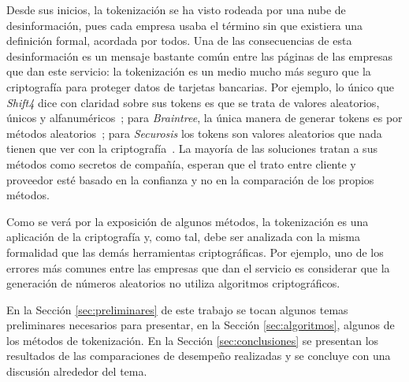 
Desde sus inicios, la tokenización se ha visto rodeada por una nube de
desinformación, pues cada empresa usaba el término sin que existiera una
definición formal, acordada por todos. Una de las consecuencias de esta
desinformación es un mensaje bastante común entre las páginas de las empresas
que dan este servicio: la tokenización es un medio mucho más seguro que la
criptografía para proteger datos de tarjetas bancarias. Por ejemplo, lo único
que \textit{Shift4} dice con claridad sobre sus tokens es que se trata de
valores aleatorios, únicos y alfanuméricos~\cite{shif4_uno}; para
\textit{Braintree}, la única manera de generar tokens es por métodos
aleatorios~\cite{braintree_uno}; para \textit{Securosis} los tokens son valores
aleatorios que nada tienen que ver con la criptografía~\cite{securosis}. La
mayoría de las soluciones tratan a sus métodos como secretos de compañía,
esperan que el trato entre cliente y proveedor esté basado en la confianza y no
en la comparación de los propios métodos.


Como se verá por la exposición de algunos métodos, la tokenización es una
aplicación de la criptografía y, como tal, debe ser analizada con la misma
formalidad que las demás herramientas criptográficas. Por ejemplo, uno de los
errores más comunes entre las empresas que dan el servicio es considerar que la
generación de números aleatorios no utiliza algoritmos criptográficos.


En la Sección \ref{sec:preliminares} de este trabajo se tocan algunos temas
preliminares necesarios para presentar, en la Sección \ref{sec:algoritmos},
algunos de los métodos de tokenización. En la Sección \ref{sec:conclusiones} se
presentan los resultados de las comparaciones de desempeño realizadas y se
concluye con una discusión alrededor del tema.



